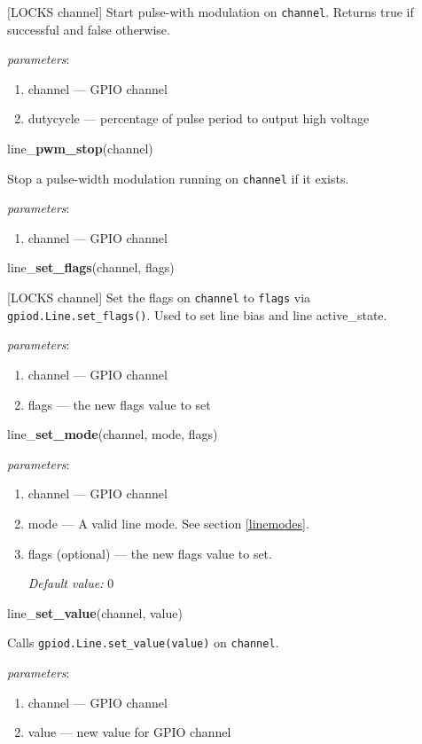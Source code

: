 \documentclass[12pt]{article}
\begin{document}
[LOCKS channel] Start pulse-with modulation on \texttt{channel}.
Returns true if successful and false otherwise.

\textit{parameters}:
\begin{enumerate}      
        \item channel --- GPIO channel
        \item dutycycle --- percentage of pulse period to output high voltage
\end{enumerate}

\noindent line\_\textbf{pwm\_stop}(channel)

Stop a pulse-width modulation running on \texttt{channel} if it exists.

\textit{parameters}:
\begin{enumerate}      
        \item channel --- GPIO channel
\end{enumerate}

\noindent line\_\textbf{set\_flags}(channel, flags)

[LOCKS channel]
Set the flags on \texttt{channel} to \texttt{flags} via \texttt{gpiod.Line.set\_flags()}. Used to set line bias and line active\_state.

\textit{parameters}:
\begin{enumerate}      
        \item channel --- GPIO channel
        \item flags --- the new flags value to set
\end{enumerate}

\noindent line\_\textbf{set\_mode}(channel, mode, flags)

\textit{parameters}:
\begin{enumerate}      
        \item channel --- GPIO channel
        \item mode --- A valid line mode. See section \ref{linemodes}.
        \item flags (optional) --- the new flags value to set.
        
        \textit{Default value:} $0$
\end{enumerate}

\noindent line\_\textbf{set\_value}(channel, value)

Calls \texttt{gpiod.Line.set\_value(value)} on \texttt{channel}.

\textit{parameters}:
\begin{enumerate}      
        \item channel --- GPIO channel
        \item value --- new value for GPIO channel
\end{enumerate}
\end{document}
